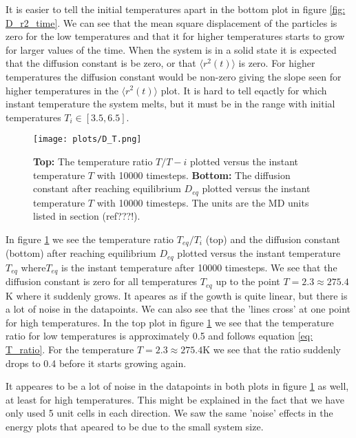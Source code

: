 \documentclass[11pt,a4wide]{article}
\begin{document}
It is easier to tell the initial temperatures apart in the bottom plot in figure \ref{fig: D_r2_time}. We can see that the mean square displacement of the particles is zero for the low temperatures and that it for higher temperatures starts to grow for larger values of the time. When the system is in a solid state it is expected that the diffusion constant is be zero, or that $\langle r^2(t) \rangle$ is zero. For higher temperatures the diffusion constant would be non-zero giving the slope seen for higher temperatures in the $\langle r^2(t) \rangle$ plot. It is hard to tell eqactly for which instant temperature the system melts, but it must be in the range with initial temperatures $T_i \in [3.5, 6.5]$.

\begin{figure}[htp]
\centering
\texttt{[image: plots/D\_T.png]}
\caption{\textbf{Top:} The temperature ratio $T/T-i$ plotted versus the instant temperature $T$ with 10000 timesteps. \textbf{Bottom:} The diffusion constant after reaching equilibrium $D_{eq}$ plotted versus the instant temperature $T$ with 10000 timesteps. The units are the MD units listed in section (ref???!).}
\label{fig: D_T}
\end{figure}

In figure \ref{fig: D_T} we see the temperature ratio $T_{eq}/T_i$ (top) and the diffusion constant (bottom) after reaching equilibrium $D_{eq}$ plotted versus the instant temperature $T_{eq}$ where$T_{eq}$ is the instant temperature after 10000 timesteps. We see that the diffusion constant is zero for all temperatures $T_{eq}$ up to the point $T = 2.3 \approx 275.4$K where it suddenly grows. It apeares as if the gowth is quite linear, but there is a lot of noise in the datapoints. We can also see that the 'lines cross' at one point for high temperatures. In the top plot in figure \ref{fig: D_T} we see that the temperature ratio for low temperatures is approximately 0.5 and follows equation \ref{eq: T_ratio}. For the temperature $T = 2.3 \approx 275.4$K we see that the ratio suddenly drops to 0.4 before it starts growing again. 

It appeares to be a lot of noise in the datapoints in both plots in figure \ref{fig: D_T} as well, at least for high temperatures. This might be explained in the fact that we have only used 5 unit cells in each direction. We saw the same 'noise' effects in the energy plots that apeared to be due to the small system size. 
\end{document}
